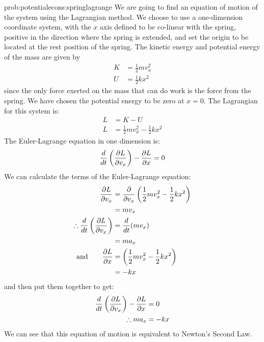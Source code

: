 \begin{solution}{prob:potentialecons:springlagrange}\label{soln:potentialecons:springlagrange} We are going to find an equation of motion of the system using the Lagrangian method. We choose to use a one-dimension coordinate system, with the $x$ axis defined to be co-linear with the spring, positive in the direction where the spring is extended, and set the origin to be located at the rest position of the spring. The kinetic energy and potential energy of the mass are given by
\begin{align*}
K&=\frac{1}{2}mv_x^2\\
U&=\frac{1}{2}kx^2
\end{align*}
since the only force exerted on the mass that can do work is the force from the spring. We have chosen the potential energy to be zero at $x=0$. The Lagrangian for this system is:
\begin{align*}
L&=K-U\\
L&=\frac{1}{2}mv_x^2-\frac{1}{2}kx^2
\end{align*}
The Euler-Lagrange equation in one dimension is:
\begin{align*}
\frac{d}{dt}\left(\frac{\partial L}{\partial v_x}\right)-\frac{\partial L}{\partial x} = 0
\end{align*}
We can calculate the terms of the Euler-Lagrange equation:
\begin{align*}
\frac{\partial L}{\partial v_x}&=\frac{\partial }{\partial v_x}\left(\frac{1}{2}mv_x^2-\frac{1}{2}kx^2\right)\\
&=mv_x\\
\therefore \frac{d}{dt}\left(\frac{\partial L}{\partial v_x}\right)&=\frac{d}{dt}(mv_x)\\
&=ma_x\\
\textrm{and}\qquad \frac{\partial L}{\partial x}&=\left(\frac{1}{2}mv_x^2-\frac{1}{2}kx^2\right)\\
&=-kx
\end{align*}
and then put them together to get:
\begin{align*}
\frac{d}{dt}\left(\frac{\partial L}{\partial v_x}\right)-\frac{\partial L}{\partial x} &= 0\\
\therefore ma_x&=-kx\\
\end{align*}
We can see that this equation of motion is equivalent to Newton's Second Law.
\end{solution}

